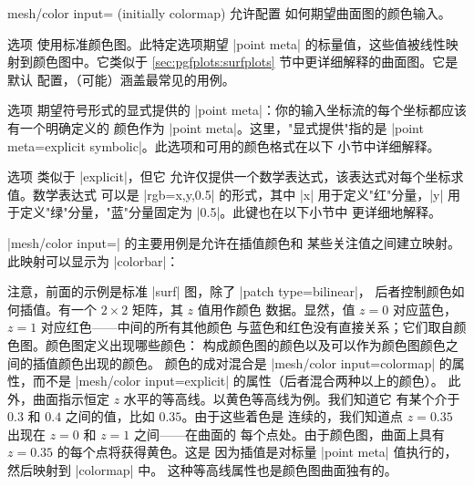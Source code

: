 {{\begin{pgfplotskey}{mesh/color input= (initially colormap)}
    允许配置 \PGFPlots{} 如何期望曲面图的颜色输入。

    选项  使用标准颜色图。此特定选项期望
    |point meta| 的标量值，这些值被线性映射到颜色图中。它类似于
    \ref{sec:pgfplots:surfplots} 节中更详细解释的曲面图。它是默认
    配置，（可能）涵盖最常见的用例。

    选项  期望符号形式的显式提供的
    |point meta|：你的输入坐标流的每个坐标都应该有一个明确定义的
    颜色作为 |point meta|。这里，"显式提供"指的是
    |point meta=explicit symbolic|。此选项和可用的颜色格式在以下
    小节中详细解释。

    选项  类似于 |explicit|，但它
    允许仅提供一个数学表达式，该表达式对每个坐标求值。数学表达式
    可以是 |rgb=x,y,0.5| 的形式，其中 |x| 用于定义"红"分量，|y|
    用于定义"绿"分量，"蓝"分量固定为 |0.5|。此键也在以下小节中
    更详细地解释。
\end{pgfplotskey}

|mesh/color input=| 的主要用例是允许在插值颜色和
某些关注值之间建立映射。此映射可以显示为 |colorbar|：
%
\begin{codeexample}[]
\end{codeexample}
%
\noindent 注意，前面的示例是标准 |surf| 图，除了 |patch type=bilinear|，
后者控制颜色如何插值。有一个 $2 \times 2$ 矩阵，其 $z$ 值用作颜色
数据。显然，值 $z=0$ 对应蓝色，$z=1$ 对应红色——中间的所有其他颜色
与蓝色和红色没有直接关系；它们取自颜色图。颜色图定义出现哪些颜色：
构成颜色图的颜色以及可以作为颜色图颜色之间的插值颜色出现的颜色。
颜色的成对混合是 |mesh/color input=colormap| 的属性，而不是
|mesh/color input=explicit| 的属性（后者混合两种以上的颜色）。
此外，曲面指示恒定 $z$ 水平的等高线。以黄色等高线为例。我们知道它
有某个介于 $0.3$ 和 $0.4$ 之间的值，比如 $0.35$。由于这些着色是
连续的，我们知道点 $z=0.35$ 出现在 $z=0$ 和 $z=1$ 之间——在曲面的
每个点处。由于颜色图，曲面上具有 $z=0.35$ 的每个点将获得黄色。这是
因为插值是对标量 |point meta| 值执行的，然后映射到 |colormap| 中。
这种等高线属性也是颜色图曲面独有的。

}}
